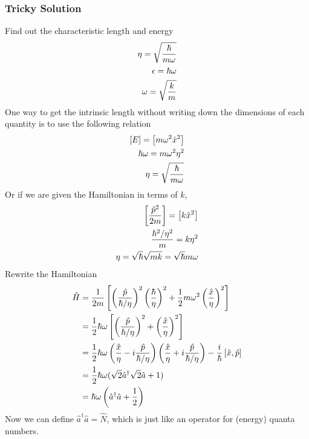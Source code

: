 \documentclass[letterpaper,10pt,english]{sphinxmanual}
\begin{document}
\subsubsection{Tricky Solution}
\label{Quantum/QuantumMechanics:tricky-solution}
Find out the characteristic length and energy
\begin{gather}
\begin{split}\eta = \sqrt{\frac{\hbar }{m\omega }} \\
\epsilon = \hbar \omega \\
\omega = \sqrt{\frac{k}{m}}\end{split}\notag
\end{gather}
One way to get the intrinsic length without writing down the dimensions of each quantity is to use the following relation
\begin{gather}
\begin{split}\left[ E \right] = \left[ m \omega^2 \hat x^2 \right] \\
\hbar \omega = m \omega^2 \eta^2 \\\
\eta = \sqrt{ \frac{\hbar}{m\omega} }\end{split}\notag
\end{gather}
Or if we are given the Hamiltonian in terms of \(k\),
\begin{gather}
\begin{split}\left[ \frac{\hat p^2}{2m} \right] = \left[ k \hat x^2 \right] \\
\frac{\hbar^2 / \eta^2 }{m} = k\eta^2 \\
\eta = \sqrt{\hbar}{ \sqrt{m k} } = \sqrt{ \hbar }{ m \omega }\end{split}\notag
\end{gather}
Rewrite the Hamiltonian
\begin{gather}
\begin{split}\hat H & =  \frac{1}{2m} \left[ \left(\frac{\hat p}{\hbar/\eta}\right)^2 \left(\frac{\hbar}{\eta}\right)^2 + \frac{1}{2} m \omega^2 \left( \frac{\hat x}{\eta} \right)^2 \right] \\
& =  \frac 1 2 \hbar \omega \left[ \left(\frac{\hat p}{\hbar/\eta}\right)^2 + \left(\frac{\hat x}{\eta}\right)^2 \right]    \\
& =  \frac 1 2 \hbar \omega \left( \frac{\hat x}{\eta} - i \frac{\hat p}{\hbar/\eta}   \right) \left( \frac{\hat x}{\eta} + i\frac{\hat p}{\hbar/\eta}  \right)  - \frac{i}{\hbar} \left[\hat x, \hat p\right]    \\
& =  \frac 1 2 \hbar \omega (\sqrt 2 \hat a^\dagger \sqrt 2 \hat a + 1) \\
& =  \hbar \omega \left( \hat a^\dagger \hat a + \frac 1 2\right)\end{split}\notag
\end{gather}
Now we can define \(\hat a^\dagger \hat a = \hat N\), which is just like an operator for (energy) quanta numbers.
\end{document}
